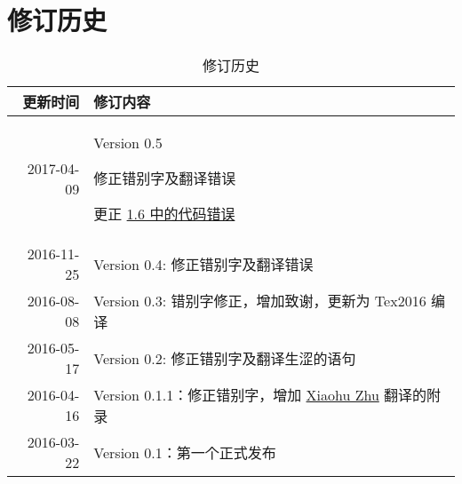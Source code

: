 
\chapter{修订历史}

\begin{table}[h]
  \centering
  \begin{tabularx}{0.9\textwidth}{ r X }
    \toprule
    \textbf{更新时间} & \textbf{修订内容}\\
    \midrule
    2017-04-09 & \vspace{-1.5ex}
									\begin{compactitem}
									\item Version 0.5
									\item 修正错别字及翻译错误
									\item 更正 \href{https://github.com/zhanggyb/nndl/issues/61}{1.6 中的代码错误}
									\end{compactitem}\\
    \midrule
    2016-11-25 & Version 0.4: 修正错别字及翻译错误 \\
    \midrule
    2016-08-08 & Version 0.3: 错别字修正，增加致谢，更新为 Tex2016 编译 \\
    \midrule
    2016-05-17 & Version 0.2: 修正错别字及翻译生涩的语句 \\
    \midrule
    2016-04-16 & Version 0.1.1：修正错别字，增加 \href{mailto:xhzhu.nju@gmail}{Xiaohu Zhu} 翻译的附录\\
    \midrule
    2016-03-22 & Version 0.1：第一个正式发布\\
    \bottomrule
  \end{tabularx}
  \caption{修订历史}
  \label{table:DocumentChanges}
\end{table}
